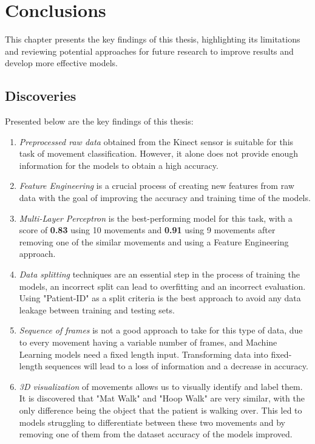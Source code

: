 \hypersetup{colorlinks=true, linkcolor=blue, citecolor=red}

\chapter{Conclusions} \label{chap:conclusions}

    This chapter presents the key findings of this thesis, highlighting its limitations and reviewing potential approaches for future research to improve results and develop more effective models.

    \section{Discoveries}

        Presented below are the key findings of this thesis: 
        \begin{enumerate}
            \item \textit{Preprocessed raw data} obtained from the Kinect sensor is suitable for this task of movement classification. However, it alone does not provide enough information for the models to obtain a high accuracy.
            \item \textit{Feature Engineering} is a crucial process of creating new features from raw data with the goal of improving the accuracy and training time of the models.
            \item \textit{Multi-Layer Perceptron} is the best-performing model for this task, with a score of \textbf{0.83} using 10 movements and \textbf{0.91} using 9 movements after removing one of the similar movements and using a Feature Engineering approach.
            \item \textit{Data splitting} techniques are an essential step in the process of training the models, an incorrect split can lead to overfitting and an incorrect evaluation. Using "Patient-ID" as a split criteria is the best approach to avoid any data leakage between training and testing sets.
            \item \textit{Sequence of frames} is not a good approach to take for this type of data, due to every movement having a variable number of frames, and Machine Learning models need a fixed length input. Transforming data into fixed-length sequences will lead to a loss of information and a decrease in accuracy.
            \item \textit{3D visualization} of movements allows us to visually identify and label them. It is discovered that "Mat Walk" and "Hoop Walk" are very similar, with the only difference being the object that the patient is walking over. This led to models struggling to differentiate between these two movements and by removing one of them from the dataset accuracy of the models improved.
        \end{enumerate}
    
